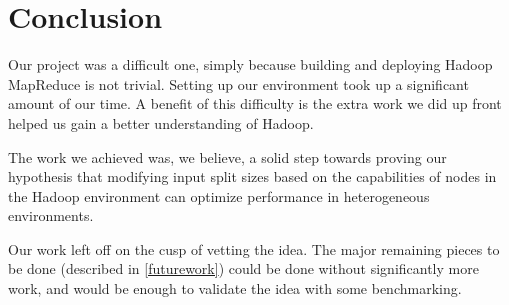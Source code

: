 \section{Conclusion}
\label{section:conclusion}
Our project was a difficult one, simply because building and deploying 
Hadoop MapReduce is not trivial. Setting up our environment took up a 
significant amount of our time. A benefit of this difficulty is the
extra work we did up front helped us gain a better understanding of
Hadoop.

The work we achieved was, we believe, a solid step towards proving our
hypothesis that modifying input split sizes based on the capabilities 
of nodes in the Hadoop environment can optimize performance in heterogeneous
environments.

Our work left off on the cusp of vetting the idea. The major remaining
pieces to be done (described in \ref{futurework}) could be done without
significantly more work, and would be enough to validate the idea with
some benchmarking.